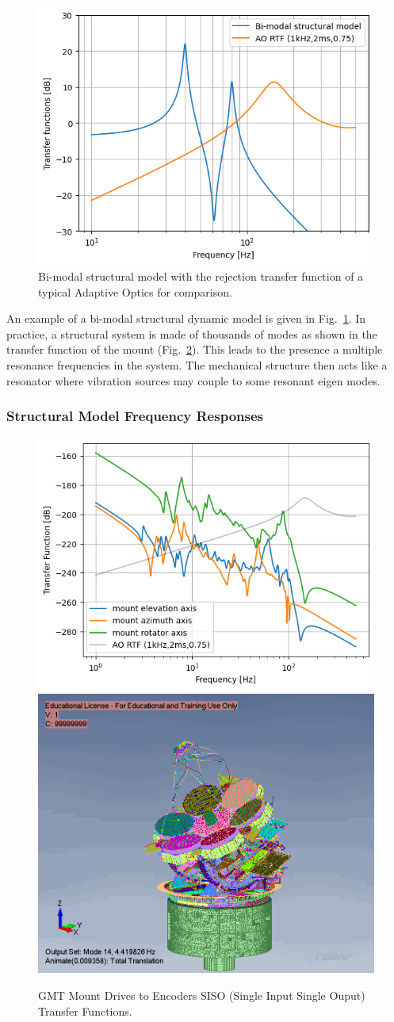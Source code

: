 \documentclass[]{AO4ELT}  %
\begin{document}
\begin{figure}
   \centering
   \includegraphics[width=0.5\linewidth]{bi-modal_sm.png}
   \caption{Bi-modal structural model with the rejection transfer function of a typical Adaptive Optics for comparison.}
   \label{fig:90}
\end{figure}

An example of a bi-modal structural dynamic model is given in Fig.~\ref{fig:90}.
In practice, a structural system is made of thousands of modes as shown in the transfer function of the mount (Fig.~\ref{fig:9}).
This leads to the presence a multiple resonance frequencies in the system.
The mechanical structure then acts like a resonator where vibration sources may couple to some resonant eigen modes.

\subsubsection{Structural Model Frequency Responses}
\label{sec:fem-frequency}

\begin{figure}
   \centering
   \includegraphics[width=0.495\linewidth]{mount-axis-tfs.png}
   \includegraphics[width=0.4\linewidth]{fem-mode-9.png}
   \caption{GMT Mount Drives to Encoders SISO (Single Input Single Ouput) Transfer Functions.}
   \label{fig:9}
\end{figure}
\end{document}
